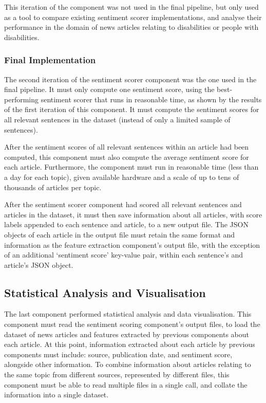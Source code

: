 \documentclass{report}
\begin{document}
This iteration of the component was not used in the final pipeline, but only used as a tool to compare existing sentiment scorer implementations, and analyse their performance in the domain of news articles relating to disabilities or people with disabilities.

\subsubsection{Final Implementation} \label{req-sentiment-final}

The second iteration of the sentiment scorer component was the one used in the final pipeline.
It must only compute one sentiment score, using the best-performing sentiment scorer that runs in reasonable time, as shown by the results of the first iteration of this component.
It must compute the sentiment scores for all relevant sentences in the dataset (instead of only a limited sample of sentences).

After the sentiment scores of all relevant sentences within an article had been computed, this component must also compute the average sentiment score for each article.
Furthermore, the component must run in reasonable time (less than a day for each topic), given available hardware and a scale of up to tens of thousands of articles per topic.

After the sentiment scorer component had scored all relevant sentences and articles in the dataset, it must then save information about all articles, with score labels appended to each sentence and article, to a new output file.
The JSON objects of each article in the output file must retain the same format and information as the feature extraction component's output file, with the exception of an additional `sentiment score' key-value pair, within each sentence's and article's JSON object.

\subsection{Statistical Analysis and Visualisation} \label{req-visualisation}

The last component performed statistical analysis and data visualisation.
This component must read the sentiment scoring component's output files, to load the dataset of news articles and features extracted by previous components about each article.
At this point, information extracted about each article by previous components must include: source, publication date, and sentiment score, alongside other information.
To combine information about articles relating to the same topic from different sources, represented by different files, this component must be able to read multiple files in a single call, and collate the information into a single dataset.
\end{document}
